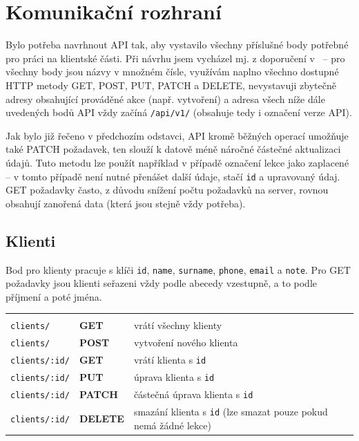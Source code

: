     \section{Komunikační rozhraní}
    Bylo potřeba navrhnout API tak, aby vystavilo všechny příslušné body potřebné pro práci na klientské části. Při návrhu jsem vycházel mj. z doporučení v~\cite{api-bestpractises} -- pro všechny body jsou názvy v množném čísle, využívám naplno všechno dostupné HTTP metody GET, POST, PUT, PATCH a DELETE, nevystavuji zbytečně adresy obsahující prováděné akce (např. vytvoření) a adresa všech níže dále uvedených bodů API vždy začíná \verb|/api/v1/| (obsahuje tedy i označení verze API).
    
    Jak bylo již řečeno v předchozím odstavci, API kromě běžných operací umožňuje také PATCH požadavek, ten slouží k datově méně náročné částečné aktualizaci údajů. Tuto metodu lze použít například v případě označení lekce jako zaplacené -- v tomto případě není nutné přenášet další údaje, stačí \verb|id| a upravovaný údaj. GET požadavky často, z důvodu snížení počtu požadavků na server, rovnou obsahují zanořená data (která jsou stejně vždy potřeba).
    
    \newcommand{\apiA}{0.33}
    \newcommand{\apiB}{0.14}
    \newcommand{\apiC}{0.43}
    
        \subsection{Klienti}
        Bod pro klienty pracuje s klíči \verb|id|, \verb|name|, \verb|surname|, \verb|phone|, \verb|email| a \verb|note|.
        Pro GET požadavky jsou klienti seřazeni vždy podle abecedy vzestupně, a to podle příjmení a poté jména.
        
            {\centering
            \begin{tabular}{p{\apiA\textwidth}p{\apiB\textwidth}p{\apiC\textwidth}}&&\\
                \verb|clients/|             & \textbf{GET}      & vrátí všechny klienty\\
                \verb|clients/|             & \textbf{POST}     & vytvoření nového klienta\\
                \verb|clients/:id/|         & \textbf{GET}      & vrátí klienta s \verb|id|\\
                \verb|clients/:id/|         & \textbf{PUT}      & úprava klienta s \verb|id|\\
                \verb|clients/:id/|         & \textbf{PATCH}    & částečná úprava klienta s \verb|id|\\
                \verb|clients/:id/|         & \textbf{DELETE}   & smazání klienta s \verb|id| (lze smazat pouze pokud nemá žádné lekce)\\
            \end{tabular}}
            
